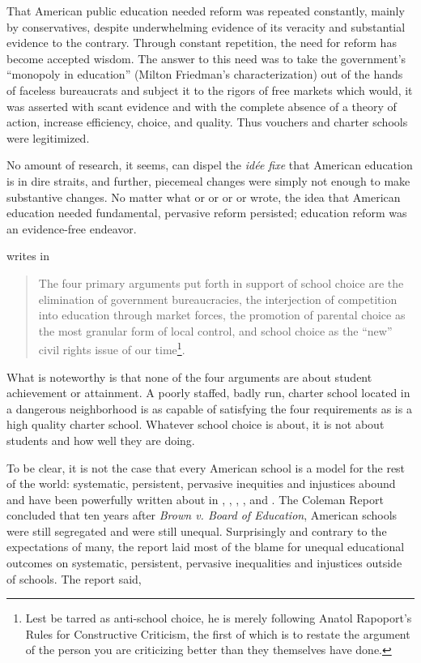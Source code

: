 That American public education needed reform was repeated constantly, mainly by conservatives, despite underwhelming evidence of its veracity and substantial evidence to the contrary. Through constant repetition, the need for reform has become accepted wisdom. The answer to this need was to take the government's ``monopoly in education'' (Milton Friedman's characterization) out of the hands of faceless bureaucrats and subject it to the rigors of free markets which would, it was asserted with scant evidence and with the complete absence of a theory of action, increase efficiency, choice, and quality. Thus vouchers and charter schools were legitimized.

No amount of research, it seems, can dispel the \textit{idée fixe} that American education is in dire straits, and further, piecemeal changes were simply not enough to make substantive changes. No matter what \textcite{Henig1994} or \textcite{Berliner.Biddle1997} or \textcite{Nichols.etal2007} or \textcite{Glass2008} or \textcite{Berliner.Glass2014} wrote, the idea that American education needed fundamental, pervasive reform persisted; education reform was an evidence-free endeavor.

\citeauthor{Garcia2018} writes in 
\blockquote[{\parencite[55]{Garcia2018}}]{\OnehalfSpacing%
The four primary arguments put forth in support of school choice are the elimination of government bureaucracies, the interjection of competition into education through market forces, the promotion of parental choice as the most granular form of local control, and school choice as the ``new'' civil rights issue of our time\footnote{Lest \citeauthor{Garcia2018} be tarred as anti-school choice, he is merely following Anatol Rapoport's Rules for Constructive Criticism, the first of which is to restate the argument of the person you are criticizing better than they themselves have done.}.} What is noteworthy is that none of the four arguments are about student achievement or attainment. A poorly staffed, badly run, charter school located in a dangerous neighborhood is as capable of satisfying the four requirements as is a high quality charter school. Whatever school choice is about, it is not about students and how well they are doing.

To be clear, it is not the case that every American school is a model for the
rest of the world: systematic, persistent, pervasive inequities and injustices
abound and have been powerfully written about in \textcite{Kozol1992}, \textcite{Valenzuela1999}, \textcite{Kozol2005}, \textcite{Heitzeg2009}, and \textcite{Roithmayr2021}. The Coleman Report \parencite{Coleman1966} concluded that ten years after \textit{Brown v. Board of Education}, American schools were still segregated and were still unequal. Surprisingly and contrary to the expectations of many, the report laid most of the blame for unequal educational outcomes on systematic, persistent, pervasive inequalities and injustices outside of schools. The report said,

